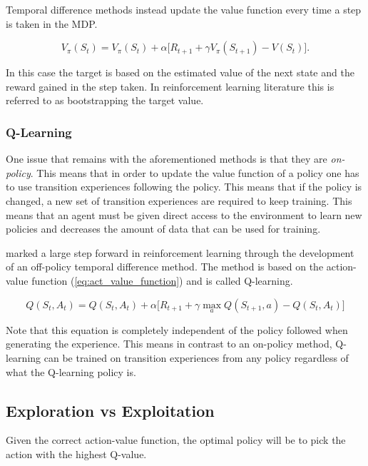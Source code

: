 Temporal difference methods instead update the value function every time a step is taken in the MDP.

\begin{equation}
    V_\pi(S_t) = V_\pi(S_t) + \alpha \big[R_{t+1} + \gamma V_\pi(S_{t+1}) - V(S_t)].
\end{equation}

In this case the target is based on the estimated value of the next state and the reward gained in the step taken. In reinforcement learning literature this is referred to as bootstrapping the target value.

\subsubsection{Q-Learning}

One issue that remains with the aforementioned methods is that they are \textit{on-policy}. This means that in order to update the value function of a policy one has to use transition experiences following the policy. This means that if the policy is changed, a new set of transition experiences are required to keep training. This means that an agent must be given direct access to the environment to learn new policies and decreases the amount of data that can be used for training. 

\cite{watkins_dayan_1992} marked a large step forward in reinforcement learning through the development of an off-policy temporal difference method. The method is based on the action-value function (\ref{eq:act_value_function}) and is called Q-learning.

\begin{equation}
    \label{eq:td_q_learning}
    Q(S_t, A_t) = Q(S_t, A_t) + \alpha\big[R_{t+1} + \gamma \max_a Q(S_{t+1}, a) - Q(S_t, A_t)]
\end{equation}

Note that this equation is completely independent of the policy followed when generating the experience. This means in contrast to an on-policy method, Q-learning can be trained on transition experiences from any policy regardless of what the Q-learning policy is.

\subsection{Exploration vs Exploitation}

Given the correct action-value function, the optimal policy will be to pick the action with the highest Q-value.

